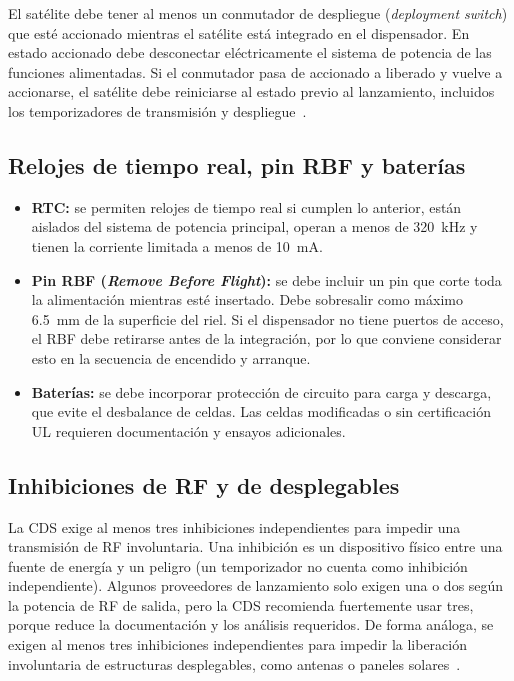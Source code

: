 El satélite debe tener al menos un conmutador de despliegue (\emph{deployment switch}) que esté accionado mientras el satélite está integrado en el dispensador. En estado accionado debe desconectar eléctricamente el sistema de potencia de las funciones alimentadas. Si el conmutador pasa de accionado a liberado y vuelve a accionarse, el satélite debe reiniciarse al estado previo al lanzamiento, incluidos los temporizadores de transmisión y despliegue~\cite{cds14}.

\subsection{Relojes de tiempo real, pin RBF y baterías}\label{subsec:cds-rbf}

\begin{itemize}
  \item \textbf{RTC:} se permiten relojes de tiempo real si cumplen lo anterior, están aislados del sistema de potencia principal, operan a menos de \SI{320}{\kilo\hertz} y tienen la corriente limitada a menos de \SI{10}{\milli\ampere}.
  \item \textbf{Pin RBF (\emph{Remove Before Flight}):} se debe incluir un pin que corte toda la alimentación mientras esté insertado. Debe sobresalir como máximo \SI{6,5}{\milli\metre} de la superficie del riel. Si el dispensador no tiene puertos de acceso, el RBF debe retirarse antes de la integración, por lo que conviene considerar esto en la secuencia de encendido y arranque.
  \item \textbf{Baterías:} se debe incorporar protección de circuito para carga y descarga, que evite el desbalance de celdas. Las celdas modificadas o sin certificación UL requieren documentación y ensayos adicionales.
\end{itemize}

\subsection{Inhibiciones de RF y de desplegables}\label{subsec:cds-inhibiciones}

La CDS exige al menos tres inhibiciones independientes para impedir una transmisión de RF involuntaria. Una inhibición es un dispositivo físico entre una fuente de energía y un peligro (un temporizador no cuenta como inhibición independiente). Algunos proveedores de lanzamiento solo exigen una o dos según la potencia de RF de salida, pero la CDS recomienda fuertemente usar tres, porque reduce la documentación y los análisis requeridos. De forma análoga, se exigen al menos tres inhibiciones independientes para impedir la liberación involuntaria de estructuras desplegables, como antenas o paneles solares~\cite{cds14}.

